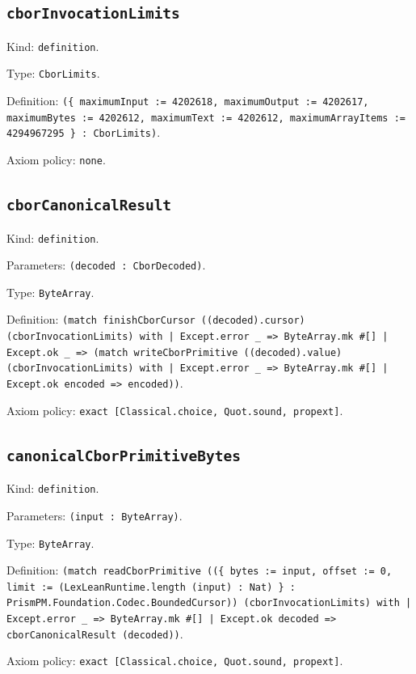 \documentclass[11pt]{article}
\begin{document}
\subsection*{\texttt{cborInvocationLimits}}
\noindent Kind: \texttt{definition}.\par
\noindent Type: \texttt{CborLimits}.\par
\noindent Definition: \texttt{(\{ maximumInput := 4202618, maximumOutput := 4202617, maximumBytes := 4202612, maximumText := 4202612, maximumArrayItems := 4294967295 \} : CborLimits)}.\par
\noindent Axiom policy: \texttt{none}.\par
\subsection*{\texttt{cborCanonicalResult}}
\noindent Kind: \texttt{definition}.\par
\noindent Parameters: \texttt{(decoded : CborDecoded)}.\par
\noindent Type: \texttt{ByteArray}.\par
\noindent Definition: \texttt{(match finishCborCursor ((decoded).cursor) (cborInvocationLimits) with | Except.error \_ => ByteArray.mk \#[] | Except.ok \_ => (match writeCborPrimitive ((decoded).value) (cborInvocationLimits) with | Except.error \_ => ByteArray.mk \#[] | Except.ok encoded => encoded))}.\par
\noindent Axiom policy: \texttt{exact [Classical.choice, Quot.sound, propext]}.\par
\subsection*{\texttt{canonicalCborPrimitiveBytes}}
\noindent Kind: \texttt{definition}.\par
\noindent Parameters: \texttt{(input : ByteArray)}.\par
\noindent Type: \texttt{ByteArray}.\par
\noindent Definition: \texttt{(match readCborPrimitive ((\{ bytes := input, offset := 0, limit := (LexLeanRuntime.length (input) : Nat) \} : PrismPM.Foundation.Codec.BoundedCursor)) (cborInvocationLimits) with | Except.error \_ => ByteArray.mk \#[] | Except.ok decoded => cborCanonicalResult (decoded))}.\par
\noindent Axiom policy: \texttt{exact [Classical.choice, Quot.sound, propext]}.\par
\end{document}
